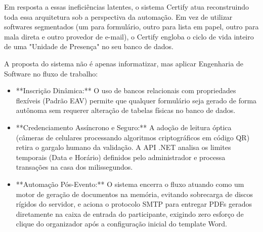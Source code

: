 Em resposta a essas ineficiências latentes, o sistema Certify atua reconstruindo toda essa arquitetura sob a perspectiva da automação. Em vez de utilizar softwares segmentados (um para formulário, outro para lista em papel, outro para mala direta e outro provedor de e-mail), o Certify engloba o ciclo de vida inteiro de uma "Unidade de Presença" no seu banco de dados.

A proposta do sistema não é apenas informatizar, mas aplicar Engenharia de Software no fluxo de trabalho:
\begin{itemize}
    \item **Inscrição Dinâmica:** O uso de bancos relacionais com propriedades flexíveis (Padrão EAV) permite que qualquer formulário seja gerado de forma autônoma sem requerer alteração de tabelas físicas no banco de dados.
    \item **Credenciamento Assíncrono e Seguro:** A adoção de leitura óptica (câmeras de celulares processando algoritmos criptográficos em código QR) retira o gargalo humano da validação. A API .NET analisa os limites temporais (Data e Horário) definidos pelo administrador e processa transações na casa dos milissegundos.
    \item **Automação Pós-Evento:** O sistema encerra o fluxo atuando como um motor de geração de documentos na memória, evitando sobrecarga de discos rígidos do servidor, e aciona o protocolo SMTP para entregar PDFs gerados diretamente na caixa de entrada do participante, exigindo zero esforço de clique do organizador após a configuração inicial do template Word.
\end{itemize}
